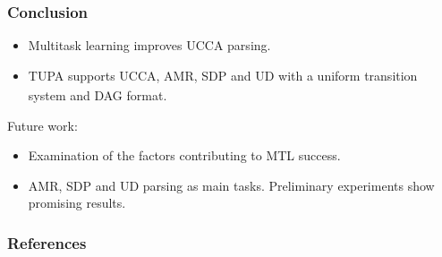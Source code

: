 \documentclass[t,xcolor={svgnames}]{beamer}
\newcommand{\parser}[1]{TUPA\textsubscript{#1}}
\begin{document}
\begin{frame}
\frametitle{Conclusion}
\begin{itemize}
 \item Multitask learning improves UCCA parsing.
 \item \parser{} supports UCCA, AMR, SDP and UD with a uniform transition system and DAG format.
\end{itemize}

Future work:
\begin{itemize}
 \item Examination of the factors contributing to MTL success.
 \item AMR, SDP and UD parsing as main tasks. Preliminary experiments show promising results.
\end{itemize}

\end{frame}



\begin{frame}[allowframebreaks]
\frametitle{References}

\tiny
\end{frame}
\end{document}
